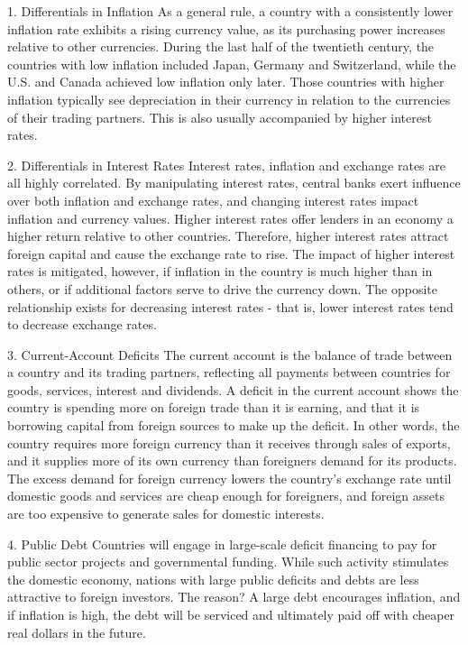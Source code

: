 1. Differentials in Inflation
As a general rule, a country with a consistently lower inflation rate exhibits a rising currency value, as its purchasing power increases relative to other currencies. During the last half of the twentieth century, the countries with low inflation included Japan, Germany and Switzerland, while the U.S. and Canada achieved low inflation only later. Those countries with higher inflation typically see depreciation in their currency in relation to the currencies of their trading partners. This is also usually accompanied by higher interest rates. 

2. Differentials in Interest Rates
Interest rates, inflation and exchange rates are all highly correlated. By manipulating interest rates, central banks exert influence over both inflation and exchange rates, and changing interest rates impact inflation and currency values. Higher interest rates offer lenders in an economy a higher return relative to other countries. Therefore, higher interest rates attract foreign capital and cause the exchange rate to rise. The impact of higher interest rates is mitigated, however, if inflation in the country is much higher than in others, or if additional factors serve to drive the currency down. The opposite relationship exists for decreasing interest rates - that is, lower interest rates tend to decrease exchange rates. 

3. Current-Account Deficits
The current account is the balance of trade between a country and its trading partners, reflecting all payments between countries for goods, services, interest and dividends. A deficit in the current account shows the country is spending more on foreign trade than it is earning, and that it is borrowing capital from foreign sources to make up the deficit. In other words, the country requires more foreign currency than it receives through sales of exports, and it supplies more of its own currency than foreigners demand for its products. The excess demand for foreign currency lowers the country's exchange rate until domestic goods and services are cheap enough for foreigners, and foreign assets are too expensive to generate sales for domestic interests. 

4. Public Debt
Countries will engage in large-scale deficit financing to pay for public sector projects and governmental funding. While such activity stimulates the domestic economy, nations with large public deficits and debts are less attractive to foreign investors. The reason? A large debt encourages inflation, and if inflation is high, the debt will be serviced and ultimately paid off with cheaper real dollars in the future. 

